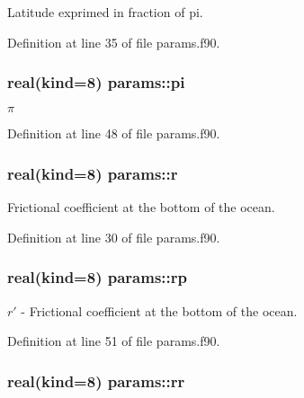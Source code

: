 Latitude exprimed in fraction of pi. 



Definition at line 35 of file params.\-f90.

\hypertarget{classparams_aaed8cf35d6e94ec5a9aeab80125e470f}{
\subsubsection[{pi}]{\setlength{\rightskip}{0pt plus 5cm}real(kind=8) params\-::pi}}\label{classparams_aaed8cf35d6e94ec5a9aeab80125e470f}


$\pi$ 



Definition at line 48 of file params.\-f90.

\hypertarget{classparams_a714367f370ac26b8a281ebd6736407b7}{
\subsubsection[{r}]{\setlength{\rightskip}{0pt plus 5cm}real(kind=8) params\-::r}}\label{classparams_a714367f370ac26b8a281ebd6736407b7}


Frictional coefficient at the bottom of the ocean. 



Definition at line 30 of file params.\-f90.

\hypertarget{classparams_ae93d91e6b6dbca141006f84d1c467921}{
\subsubsection[{rp}]{\setlength{\rightskip}{0pt plus 5cm}real(kind=8) params\-::rp}}\label{classparams_ae93d91e6b6dbca141006f84d1c467921}


$r'$ -\/ Frictional coefficient at the bottom of the ocean. 



Definition at line 51 of file params.\-f90.

\hypertarget{classparams_ac1c1ed1ab5fcbdbd6a77b8a5c69fc6e5}{
\subsubsection[{rr}]{\setlength{\rightskip}{0pt plus 5cm}real(kind=8) params\-::rr}}\label{classparams_ac1c1ed1ab5fcbdbd6a77b8a5c69fc6e5}


